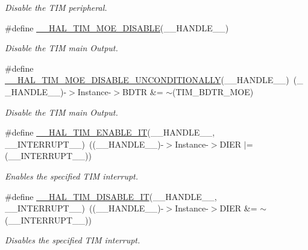 \begin{DoxyCompactItemize}
\begin{DoxyCompactList}\small\item\em Disable the T\+IM peripheral. \end{DoxyCompactList}\item 
\#define \hyperlink{group___t_i_m___exported___macros_ga69d63e147faeca8909e9679f684c0325}{\+\_\+\+\_\+\+H\+A\+L\+\_\+\+T\+I\+M\+\_\+\+M\+O\+E\+\_\+\+D\+I\+S\+A\+B\+LE}(\+\_\+\+\_\+\+H\+A\+N\+D\+L\+E\+\_\+\+\_\+)
\begin{DoxyCompactList}\small\item\em Disable the T\+IM main Output. \end{DoxyCompactList}\item 
\#define \hyperlink{group___t_i_m___exported___macros_gaa5c4053e8e57dc234efecbb698287b55}{\+\_\+\+\_\+\+H\+A\+L\+\_\+\+T\+I\+M\+\_\+\+M\+O\+E\+\_\+\+D\+I\+S\+A\+B\+L\+E\+\_\+\+U\+N\+C\+O\+N\+D\+I\+T\+I\+O\+N\+A\+L\+LY}(\+\_\+\+\_\+\+H\+A\+N\+D\+L\+E\+\_\+\+\_\+)~(\+\_\+\+\_\+\+H\+A\+N\+D\+L\+E\+\_\+\+\_\+)-\/$>$Instance-\/$>$B\+D\+TR \&= $\sim$(T\+I\+M\+\_\+\+B\+D\+T\+R\+\_\+\+M\+OE)
\begin{DoxyCompactList}\small\item\em Disable the T\+IM main Output. \end{DoxyCompactList}\item 
\#define \hyperlink{group___t_i_m___exported___macros_ga4d69943bc4716743c78e3194e259097e}{\+\_\+\+\_\+\+H\+A\+L\+\_\+\+T\+I\+M\+\_\+\+E\+N\+A\+B\+L\+E\+\_\+\+IT}(\+\_\+\+\_\+\+H\+A\+N\+D\+L\+E\+\_\+\+\_\+,  \+\_\+\+\_\+\+I\+N\+T\+E\+R\+R\+U\+P\+T\+\_\+\+\_\+)~((\+\_\+\+\_\+\+H\+A\+N\+D\+L\+E\+\_\+\+\_\+)-\/$>$Instance-\/$>$D\+I\+ER $\vert$= (\+\_\+\+\_\+\+I\+N\+T\+E\+R\+R\+U\+P\+T\+\_\+\+\_\+))
\begin{DoxyCompactList}\small\item\em Enables the specified T\+IM interrupt. \end{DoxyCompactList}\item 
\#define \hyperlink{group___t_i_m___exported___macros_ga31d67e905bc62e3142179dc4bbf8ba64}{\+\_\+\+\_\+\+H\+A\+L\+\_\+\+T\+I\+M\+\_\+\+D\+I\+S\+A\+B\+L\+E\+\_\+\+IT}(\+\_\+\+\_\+\+H\+A\+N\+D\+L\+E\+\_\+\+\_\+,  \+\_\+\+\_\+\+I\+N\+T\+E\+R\+R\+U\+P\+T\+\_\+\+\_\+)~((\+\_\+\+\_\+\+H\+A\+N\+D\+L\+E\+\_\+\+\_\+)-\/$>$Instance-\/$>$D\+I\+ER \&= $\sim$(\+\_\+\+\_\+\+I\+N\+T\+E\+R\+R\+U\+P\+T\+\_\+\+\_\+))
\begin{DoxyCompactList}\small\item\em Disables the specified T\+IM interrupt. \end{DoxyCompactList}\item 

\end{DoxyCompactItemize}
